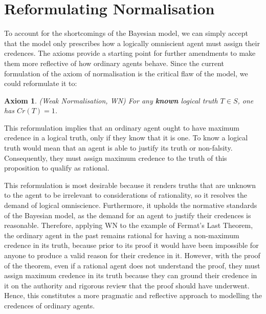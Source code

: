 \documentclass[12pt]{article}
\newtheorem{axiom}{Axiom}
\begin{document}
\section{Reformulating Normalisation}
To account for the shortcomings of the Bayesian model, we can simply accept that the model only prescribes how a logically omniscient agent must assign their credences. The axioms provide a starting point for further amendments to make them more reflective of how ordinary agents behave. Since the current formulation of the axiom of normalisation is the critical flaw of the model, we could reformulate it to:
\begin{axiom}
    (Weak Normalisation, WN) For any \textbf{known} logical truth $T\in S$, one has $Cr(T)=1$.
\end{axiom}
This reformulation implies that an ordinary agent ought to have maximum credence in a logical truth, only if they know that it is one.\autocite{sep} To know a logical truth would mean that an agent is able to justify its truth or non-falsity. Consequently, they must assign maximum credence to the truth of this proposition to qualify as rational.

This reformulation is most desirable because it renders truths that are unknown to the agent to be irrelevant to considerations of rationality, so it resolves the demand of logical omniscience. Furthermore, it upholds the normative standards of the Bayesian model, as the demand for an agent to justify their credences is reasonable. Therefore, applying WN to the example of Fermat's Last Theorem, the ordinary agent in the past remains rational for having a non-maximum credence in its truth, because prior to its proof it would have been impossible for anyone to produce a valid reason for their credence in it. However, with the proof of the theorem, even if a rational agent does not understand the proof, they must assign maximum credence in its truth because they can ground their credence in it on the authority and rigorous review that the proof should have underwent. Hence, this constitutes a more pragmatic and reflective approach to modelling the credences of ordinary agents.
\end{document}
